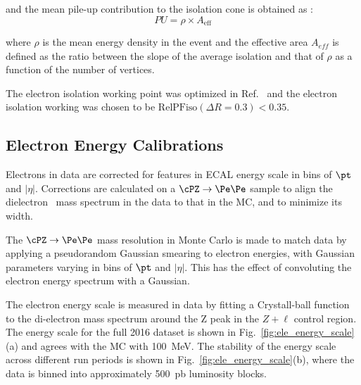 and the mean pile-up contribution to the isolation cone is obtained as :  
\begin{equation}
 PU =  \rho \times A_\text{eff}
\label{eqn:purho}
\end{equation}

where $\rho$ is the mean energy density in the event and the effective area $A_{eff}$ is defined as the ratio
between the slope of the average isolation and that of $\rho$ as a function of the number of vertices. 

The electron isolation working point was optimized in Ref.~\cite{AN-15-277} and the electron isolation working was 
chosen to be $\text{RelPFiso}(\Delta R = 0.3) < 0.35$. 


\subsection{Electron Energy Calibrations}

Electrons in data are corrected for features in ECAL energy scale
in bins of $\pt$ and $\left| \eta \right|$. Corrections are calculated
on a $\cPZ \to \Pe\Pe$ sample to align the dielectron 
mass spectrum in the data to that in the MC, and to
minimize its width.

The $\cPZ \to \Pe\Pe$ mass resolution in Monte Carlo is made to match
data by applying a pseudorandom Gaussian smearing to electron energies,
with Gaussian parameters varying in bins of $\pt$ and $\left| \eta \right|$.
This has the effect of convoluting the electron energy spectrum with a
Gaussian.

The electron energy scale is measured in data by fitting a Crystall-ball function to the di-electron mass spectrum around the Z peak in the $Z+\ell$ control region. 
The energy scale for the full 2016 dataset is shown in Fig.~\ref{fig:ele_energy_scale}(a) and agrees with the MC with 100~MeV. 
The stability of the energy scale across different run periods is shown in Fig.~\ref{fig:ele_energy_scale}(b), where the data is binned into approximately 500~pb luminosity blocks.


